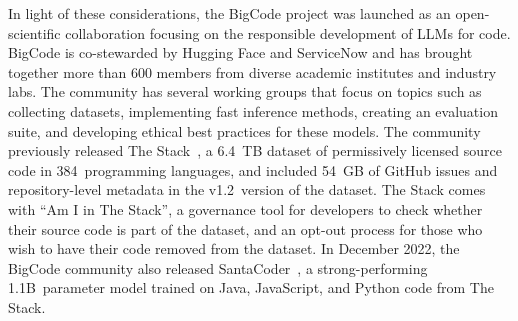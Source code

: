 In light of these considerations, the BigCode project was launched as an open-scientific collaboration focusing on the responsible development of LLMs for code. BigCode is co-stewarded by Hugging Face and ServiceNow and has brought together more than 600 members from diverse academic institutes and industry labs. The community has several working groups that focus on topics such as collecting datasets, implementing fast inference methods, creating an evaluation suite, and developing ethical best practices for these models. The community previously released The Stack~\citep{Kocetkov2022TheStack}, a 6.4~TB dataset of permissively licensed source code in 384~programming languages, and included 54~GB of GitHub issues and repository-level metadata in the v1.2~version of the dataset. The Stack comes with ``Am I in The Stack'', a governance tool for developers to check whether their source code is part of the dataset, and an opt-out process for those who wish to have their code removed from the dataset. In December 2022, the BigCode community also released SantaCoder~\citep{allal2023santacoder}, a strong-performing 1.1B~parameter model trained on Java, JavaScript, and Python code from The Stack. 


